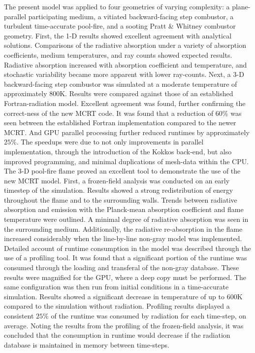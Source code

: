 The present model was applied to four geometries of varying complexity: a plane-parallel participating medium, a vitiated backward-facing step combustor, a turbulent time-accurate pool-fire, and a sooting Pratt \& Whitney combustor geometry.
First, the 1-D results showed excellent agreement with analytical solutions. Comparisons of the radiative absorption under a variety of absorption coefficients, medium temperatures, and ray counts showed expected results. Radiative absorption increased with absorption coefficient and temperature, and stochastic variability became more apparent with lower ray-counts.
Next, a 3-D backward-facing step combustor was simulated at a moderate temperature of approximately $800$K. Results were compared against those of an established Fortran-radiation model. Excellent agreement was found, further confirming the correct-ness of the new MCRT code. It was found that a reduction of $60$\% was seen between the established Fortran implementation compared to the newer MCRT. And GPU parallel processing further reduced runtimes by approximately $25$\%. The speedups were due to not only improvements in parallel implementation, through the introduction of the Kokkos back-end, but also improved programming, and minimal duplications of mesh-data within the CPU.
The 3-D pool-fire flame proved an excellent tool to demonstrate the use of the new MCRT model. First, a frozen-field analysis was conducted on an early timestep of the simulation. Results showed a strong redistribution of energy throughout the flame and to the surrounding walls. Trends between radiative absorption and emission with the Planck-mean absorption coefficient and flame temperature were outlined. A minimal degree of radiative absorption was seen in the surrounding medium. Additionally, the radiative re-absorption in the flame increased considerably when the line-by-line non-gray model was implemented. Detailed account of runtime consumption in the model was described through the use of a profiling tool. It was found that a significant portion of the runtime was consumed through the loading and transferal of the non-gray database. These results were magnified for the GPU, where a deep copy must be performed.
The same configuration was then run from initial conditions in a time-accurate simulation. Results showed a significant decrease in temperature of up to $600$K compared to the simulation without radiation. Profiling results displayed a consistent $25$\% of the runtime was consumed by radiation for each time-step, on average. Noting the results from the profiling of the frozen-field analysis, it was concluded that the consumption in runtime would decrease if the radiation database is maintained in memory between time-steps.
